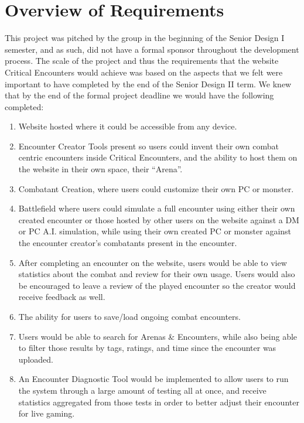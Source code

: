 \documentclass[letterpaper, 10 pt, conference]{ieeeconf}
\begin{document}
\section{Overview of Requirements}

This project was pitched by the group in the beginning of the Senior Design I semester, and as such, did not have a formal sponsor throughout the development process. The scale of the project and thus the requirements that the website Critical Encounters would achieve was based on the aspects that we felt were important to have completed by the end of the Senior Design II term. We knew that by the end of the formal project deadline we would have the following completed:
\begin{enumerate}
	\item Website hosted where it could be accessible from any device.
	\item Encounter Creator Tools present so users could invent their own combat centric encounters inside Critical Encounters, and the ability to host them on the website in their own space, their ``Arena''.
	\item Combatant Creation, where users could customize their own PC or monster.
	\item Battlefield where users could simulate a full encounter using either their own created encounter or those hosted by other users on the website against a DM or PC A.I. simulation, while using their own created PC or monster against the encounter creator's combatants present in the encounter.
	\item After completing an encounter on the website, users would be able to view statistics about the combat and review for their own usage. Users would also be encouraged to leave a review of the played encounter so the creator would receive feedback as well.
	\item The ability for users to save/load ongoing combat encounters.
	\item Users would be able to search for Arenas \& Encounters, while also being able to filter those results by tags, ratings, and time since the encounter was uploaded.
	\item An Encounter Diagnostic Tool would be implemented to allow users to run the system through a large amount of testing all at once, and receive statistics aggregated from those tests in order to better adjust their encounter for live gaming. 
\end{enumerate}
\end{document}
